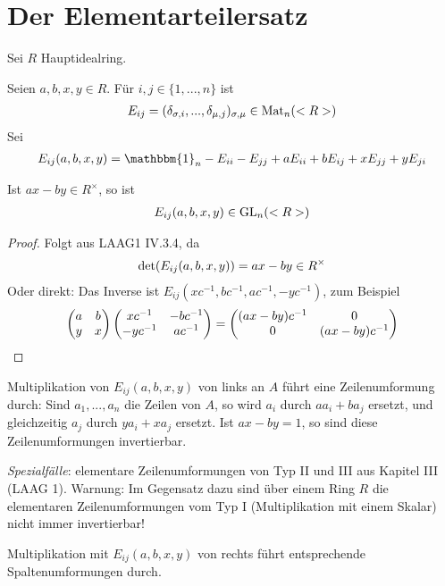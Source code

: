\section{Der Elementarteilersatz}

Sei $R$ Hauptidealring.

\begin{definition}
	Seien $a,b,x,y\in R$. Für $i,j\in\{1,...,n\}$ ist
	\begin{align}
		E_{ij} = (\delta_{\sigma,i},...,\delta_{\mu,j})_{\sigma,\mu}\in\operatorname{Mat}_n(<R>)\notag
	\end{align}
	Sei
	\begin{align}
		E_{ij}(a,b,x,y) = \mathbbm{1}_n-E_{ii}-E_{jj}+aE_{ii}+bE_{ij}+xE_{jj}+yE_{ji}\notag
	\end{align}
\end{definition}

\begin{lemma}
	Ist $ax-by\in R^\times$, so ist
	\begin{align}
		E_{ij}(a,b,x,y)\in \operatorname{GL}_n(<R>)\notag
	\end{align}
\end{lemma}
\begin{proof}
	Folgt aus LAAG1 IV.3.4, da
	\begin{align}
		\det(E_{ij}(a,b,x,y))=ax-by\in R^\times\notag
	\end{align}
	Oder direkt: Das Inverse ist $E_{ij}(xc^{-1},bc^{-1}, ac^{-1},-yc^{-1})$, zum Beispiel
	\begin{align}
		\begin{pmatrix} a & b \\ y & x\end{pmatrix}\begin{pmatrix}xc^{-1} & -bc^{-1} \\ -yc^{-1} & ac^{-1}\end{pmatrix}=\begin{pmatrix}(ax-by)c^{-1} & 0 \\ 0 & (ax-by)c^{-1}\end{pmatrix}\notag
	\end{align}
\end{proof}

\begin{remark}
	Multiplikation von $E_{ij}(a,b,x,y)$ von links an $A$ führt eine Zeilenumformung durch: Sind $a_1,...,a_n$ die Zeilen von $A$, so wird $a_i$ durch $aa_i+ba_j$ ersetzt, und gleichzeitig $a_j$ durch $ya_i+xa_j$ ersetzt. Ist $ax-by=1$, so sind diese Zeilenumformungen invertierbar.
	
	\emph{Spezialfälle}: elementare Zeilenumformungen von Typ II und III aus Kapitel III (LAAG 1). Warnung: Im Gegensatz dazu sind über einem Ring $R$ die elementaren Zeilenumformungen vom Typ I (Multiplikation mit einem Skalar) nicht immer invertierbar!
	
	Multiplikation mit $E_{ij}(a,b,x,y)$ von rechts führt entsprechende Spaltenumformungen durch.
\end{remark}


